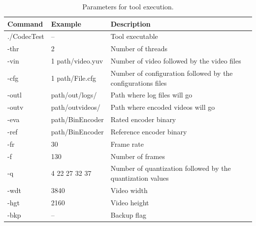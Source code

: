 \documentclass[journal]{IEEEtran}
\begin{document}
\begin{table}[!ht]

\centering
\caption{Parameters for tool execution.}
\label{parameter_tool}
\renewcommand*{\arraystretch}{1.5}
\small
\begin{tabular}{|l|l|p{4cm}|l|}
\hline
\textbf{Command} & \textbf{Example}      & \textbf{Description}                                         \\ \hline
./CodecTest      & --                    & Tool executable                                                             \\ \hline
-thr             & 2                     & Number of threads                                            \\ \hline
-vin             & 1 path/video.yuv  & Number of video followed by the video files                  \\ \hline
-cfg             & 1 path/File.cfg & Number of configuration followed by the configurations files \\ \hline
-outl            & path/out/logs/      & Path where log files will go                                 \\ \hline
-outv            & path/outvideos/    & Path where encoded videos will go                            \\ \hline
-eva             & path/BinEncoder    & Rated encoder binary                                         \\ \hline
-ref             & path/BinEncoder    & Reference encoder binary                                     \\ \hline
-fr              & 30                    & Frame rate                                                   \\ \hline
-f               & 130                   & Number of frames                                             \\ \hline
-q             	 & 4 22 27 32 37        & Number of quantization followed by the quantization values   \\ 
\hline
-wdt             & 3840                  & Video width                                                  \\ \hline
-hgt             & 2160                  & Video height                                                 \\ \hline
-bkp             & --                    & Backup flag                                                  \\ \hline
\end{tabular}
\end{table}
\FloatBarrier
\end{document}
